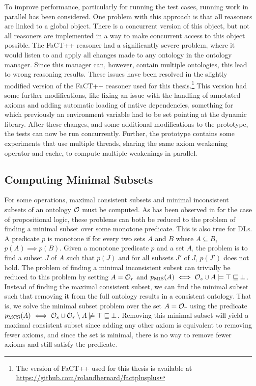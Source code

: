 To improve performance, particularly for running the test cases, running work in parallel has been considered. One problem with this approach is that all reasoners are linked to a global  object. There is a concurrent version of this object, but not all reasoners are implemented in a way to make concurrent access to this object possible. The FaCT++ reasoner \cite{factpp} had a significantly severe problem, where it would listen to and apply all changes made to any ontology in the ontology manager. Since this manager can, however, contain multiple ontologies, this lead to wrong reasoning results. These issues have been resolved in the slightly modified version of the FaCT++ reasoner used for this thesis.\footnote{The version of FaCT++ used for this thesis is available at \url{https://github.com/rolandbernard/factplusplus}} This version had some further modifications, like fixing an issue with the handling of annotated axioms and adding automatic loading of native dependencies, something for which previously an environment variable had to be set pointing at the dynamic library. After these changes, and some additional modifications to the prototype, the tests can now be run concurrently. Further, the prototype contains some experiments that use multiple threads, sharing the same axiom weakening operator and cache, to compute multiple weakenings in parallel.

\subsection{Computing Minimal Subsets}\label{minimal-set-impl}

For some operations, maximal consistent subsets and minimal inconsistent subsets of an ontology $\mathcal{O}$ must be computed. As has been observed in \cite{marques2013minimal} for the case of propositional logic, these problems can both be reduced to the problem of finding a minimal subset over some monotone predicate. This is also true for DLs. A predicate $p$ is monotone if for every two sets $A$ and $B$ where $A \subseteq B$, $p(A) \implies p(B)$. Given a monotone predicate $p$ and a set $A$, the problem is to find a subset $J$ of $A$ such that $p(J)$ and for all subsets $J'$ of $J$, $p(J')$ does not hold. The problem of finding a minimal inconsistent subset can trivially be reduced to this problem by setting $A = \mathcal{O}_r$ and $p_\textnormal{MIS}(A) \iff \mathcal{O}_s \cup A \models \top \sqsubseteq \bot$. Instead of finding the maximal consistent subset, we can find the minimal subset such that removing it from the full ontology results in a consistent ontology. That is, we solve the minimal subset problem over the set $A = \mathcal{O}_r$ using the predicate $p_\textnormal{MCS}(A) \iff \mathcal{O}_s \cup \mathcal{O}_r \setminus A \not\models \top \sqsubseteq \bot$. Removing this minimal subset will yield a maximal consistent subset since adding any other axiom is equivalent to removing fewer axioms, and since the set is minimal, there is no way to remove fewer axioms and still satisfy the predicate.

